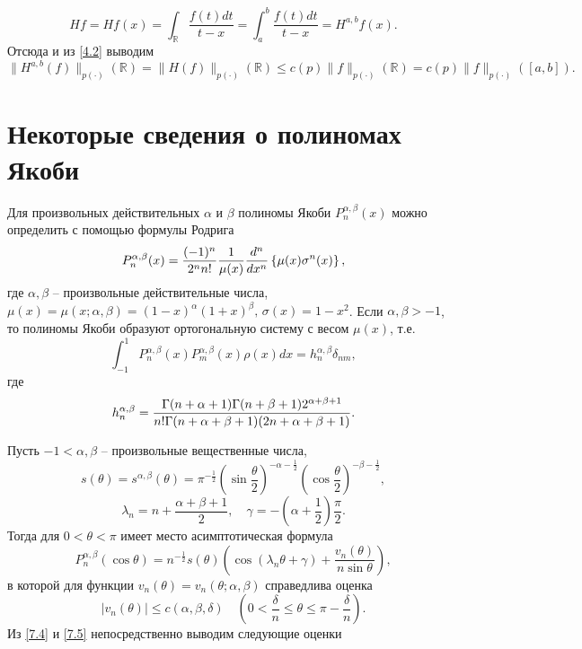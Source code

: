  \begin{equation*}
Hf=Hf(x)=\int_\mathbb{R}\frac{f(t)dt}{t-x}=\int_{a}^{b}\frac{f(t)dt}{t-x}=H^{a,b}f(x).
\end{equation*}
Отсюда и из \eqref{4.2} выводим
\begin{equation}\label{4.4}
\|H^{a,b}(f)\|_{p(\cdot)}(\mathbb{R})=\|H(f)\|_{p(\cdot)}(\mathbb{R})\le c(p)\|f\|_{p(\cdot)}(\mathbb{R})=c(p)\|f\|_{p(\cdot)}([a,b]).
\end{equation}






 \section{Некоторые сведения о полиномах Якоби}
 Для произвольных действительных $\alpha$ и $\beta$ полиномы Якоби  $P_n^{\alpha,\beta}(x)$ можно определить \cite{ShIIBJWSege}  с помощью формулы Родрига
 \begin{equation}\label{7.1}
P_n^{\alpha,\beta}(x) = {(-1)^n\over2^nn!}{1\over\mu(x)}{d^n\over
dx^n} \left\{\mu(x)\sigma^n(x)\right\},
\end{equation}
где $\alpha,\beta$ -- произвольные действительные числа, $\mu(x)=
\mu(x;\alpha,\beta) =
(1-x)^\alpha(1+x)^\beta,\,\sigma(x)=1-x^2$. Если
$\alpha,\beta>-1$, то полиномы Якоби образуют ортогональную
систему с весом $\mu(x)$, т.е.
\begin{equation}\label{7.2}
\int_{-1}^1P_n^{\alpha,\beta}(x)P_m^{\alpha,\beta}(x)\rho(x)dx =
h_n^{\alpha,\beta}\delta_{nm},
\end{equation}
где
\begin{equation}\label{7.3}
h_n^{\alpha,\beta} =
{\Gamma(n+\alpha+1)\Gamma(n+\beta+1)2^{\alpha+\beta+1} \over
n!\Gamma(n+\alpha+\beta+1)(2n+\alpha+\beta+1)}.
\end{equation}

Пусть $-1<\alpha, \beta$ -- произвольные вещественные числа,
$$
s(\theta)=s^{\alpha,\beta}(\theta)=\pi^{-\frac12}
\left(\sin\frac{\theta}{2}\right)^{-\alpha-\frac12}
\left(\cos\frac{\theta}{2}\right)^{-\beta-\frac12},
$$
$$
\lambda_n=n+\frac{\alpha+\beta+1}{2}, \quad\gamma=-
\left(\alpha+\frac{1}{2}\right)\frac{\pi}{2}.
$$
Тогда для $0<\theta<\pi$ имеет место асимптотическая формула
\begin{equation}\label{7.4}
P_n^{\alpha,\beta}(\cos\theta)=n^{-\frac12}s(\theta)
\left(\cos(\lambda_n\theta+\gamma)+
\frac{v_n(\theta)}{n\sin\theta}\right),
\end{equation}
в которой для функции $v_n(\theta)=v_n(\theta;\alpha,\beta)$
справедлива оценка
\begin{equation}\label{7.5}
|v_n(\theta)|\le c(\alpha,\beta,\delta)\quad
 \left(0<\frac{\delta}{n}\le\theta\le\pi-\frac{\delta}{n}\right).
\end{equation}
Из \eqref{7.4} и  \eqref{7.5} непосредственно выводим следующие оценки


